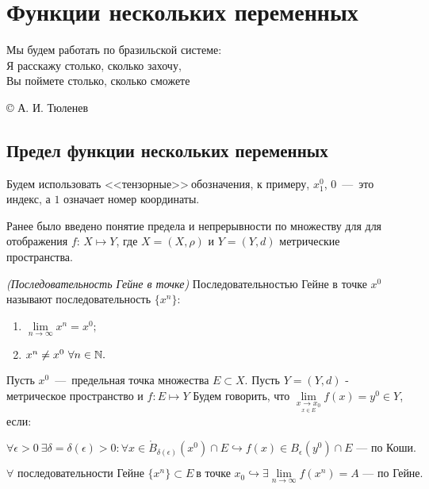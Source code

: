 \section{Функции нескольких переменных}

\setlength{\epigraphwidth}{0.5\textwidth}
\epigraph{\normalsize{Мы будем работать по бразильской системе:\\Я расскажу столько, сколько захочу, \\ Вы поймете столько, сколько сможете}}{\large{© А. И. Тюленев}}


\subsection{Предел функции нескольких переменных}

Будем использовать <<тензорные>>$\ $обозначения, к примеру, $x^0 _1$, $0$~---~это индекс, а $1$ означает номер координаты.

Ранее было введено понятие предела и непрерывности по множеству для для отображения $f$: $X \mapsto Y$, где $X = (X, \rho)$ и $Y = (Y, d)$ метрические пространства.

\begin{definition}
    \textit{(Последовательность Гейне в точке)} Последовательностью Гейне в точке $x^0$ называют последовательность $\{x^n\}$:

        \begin{enumerate}
        \item $\lim\limits_{n\to \infty} x^{n} = x^{0};$
        \item $x^{n} \neq x^{0} \  \forall n \in \mathbb{N}.$
    \end{enumerate}
\end{definition}

\begin{definition}
    Пусть $x^{0}$~---~предельная точка множества $E \subset X$. Пусть $Y = (Y, d)$ - метрическое пространство и $f: E \mapsto Y$ 
    Будем говорить, что $\lim\limits_{\underset{x \in E}{x\to x_{0}}} f (x) = y^{0} \in Y$, если:

    $$ \forall \epsilon > 0 \  \exists \delta =  \delta (\epsilon) > 0: \forall x \in \mathring{B}_{\delta (\epsilon)} (x^{0}) \cap E \hookrightarrow f (x) \in B_{\epsilon} (y^{0}) \cap E \text{~---~по Коши.}$$

    

    $$ \forall \text{ последовательности Гейне }\{ x^{n}\} \subset E \  \text{в точке } x_{0} \hookrightarrow  \exists  \lim\limits_{n\to \infty} f (x^{n}) = A\text{~---~по Гейне.}$$
        
\end{definition}

